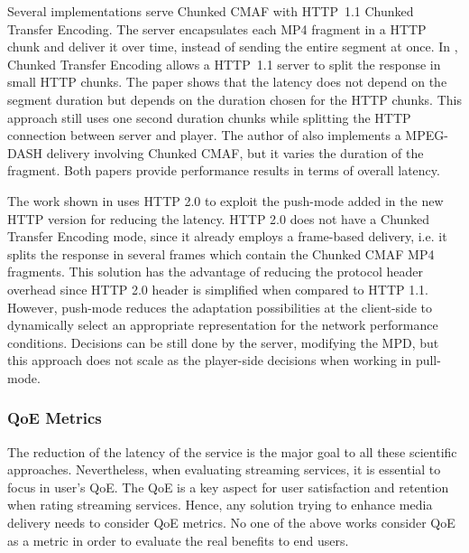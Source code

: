 Several implementations serve Chunked CMAF with \mbox{HTTP 1.1} Chunked Transfer Encoding. The server encapsulates each MP4 fragment in a HTTP chunk and deliver it over time, instead of sending the entire segment at once. In \cite{saminathan2011}, Chunked Transfer Encoding allows a \mbox{HTTP 1.1} server to split the response in small HTTP chunks. The paper shows that the latency does not depend on the segment duration but depends on the duration chosen for the HTTP chunks. This approach still uses one second duration chunks while splitting the HTTP connection between server and player. The author of \cite{essaili2018} also implements a MPEG-DASH delivery involving Chunked CMAF, but it varies the duration of the fragment. Both papers provide performance results in terms of overall latency.

The work shown in \cite{wei2014} uses HTTP 2.0 to exploit the \mbox{push-mode} added in the new HTTP version for reducing the latency. HTTP 2.0 does not have a Chunked Transfer \mbox{Encoding} mode, since it already employs a frame-based \mbox{delivery}, i.e. it splits the response in several frames which contain the Chunked CMAF MP4 fragments. This solution has the \mbox{advantage} of reducing the protocol header overhead since HTTP 2.0 header is simplified when compared to HTTP 1.1. However, push-mode reduces the adaptation possibilities at the client-side to dynamically select an appropriate representation for the network performance conditions. Decisions can be still done by the server, modifying the MPD, but this approach does not scale as the player-side decisions when working in pull-mode.

\subsubsection{QoE Metrics}

The reduction of the latency of the service is the major goal to all these scientific approaches. Nevertheless, when evaluating streaming services, it is essential to focus in user's QoE. The QoE is a key aspect for user satisfaction and retention when rating streaming services. Hence, any solution trying to enhance media delivery needs to consider QoE metrics. No one of the above works consider QoE as a metric in order to evaluate the real benefits to end users.


